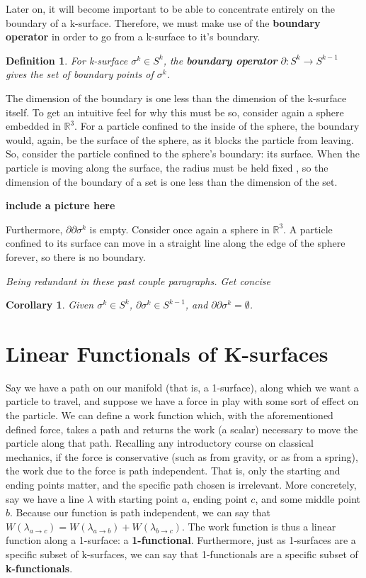 \documentclass{book}
\newtheorem{defn}[equation]{Definition}
\newtheorem{coro}[equation]{Corollary}
\begin{document}
Later on, it will become important to be able to concentrate entirely on the boundary of a k-surface. Therefore, we must make use of the \textbf{boundary operator} in order to go from a k-surface to it's boundary. 

\begin{defn}
	For k-surface $\sigma^k \in S^k$, the \textbf{boundary operator} $\partial : S^k \to S^{k-1}$ gives the set of boundary points of $\sigma^k$. 
\end{defn}



The dimension of the boundary is one less than the dimension of the k-surface itself. To get an intuitive feel for why this must be so, consider again a sphere embedded in $\mathbb{R}^3$. For a particle confined to the inside of the sphere, the boundary would, again, be the surface of the sphere, as it blocks the particle from leaving. So, consider the particle confined to the sphere's boundary: its surface. When the particle is moving along the surface, the radius must be held fixed , so the dimension of the boundary of a set is one less than the dimension of the set. 

\textbf{include a picture here}


Furthermore, $\partial\partial \sigma^k$ is empty. Consider once again a sphere in $\mathbb{R}^3$. A particle confined to its surface can move in a straight line along the edge of the sphere forever, so there is no boundary. 

\emph{Being redundant in these past couple paragraphs. Get concise}

\begin{coro}
	Given $\sigma^k \in S^k$, $\partial \sigma^k \in S^{k-1}$, and $\partial\partial \sigma^k = \emptyset$. 
\end{coro}


\section{Linear Functionals of K-surfaces}

Say we have a path on our manifold (that is, a 1-surface), along which we want a particle to travel, and suppose we have a force in play with some sort of effect on the particle. We can define a work function which, with the aforementioned defined force, takes a path and returns the work (a scalar) necessary to move the particle along that path. Recalling any introductory course on classical mechanics, if the force is conservative (such as from gravity, or as from a spring), the work due to the force is path independent. That is, only the starting and ending points matter, and the specific path chosen is irrelevant. More concretely, say we have a line $\lambda$ with starting point $a$, ending point $c$, and some middle point $b$. Because our function is path independent, we can say that $W(\lambda_{a \to c}) = W(\lambda_{a \to b}) + W(\lambda_{b \to c})$. The work function is thus a linear function along a 1-surface: a \textbf{1-functional}. Furthermore, just as 1-surfaces are a specific subset of k-surfaces, we can say that 1-functionals are a specific subset of \textbf{k-functionals}. 
\end{document}
